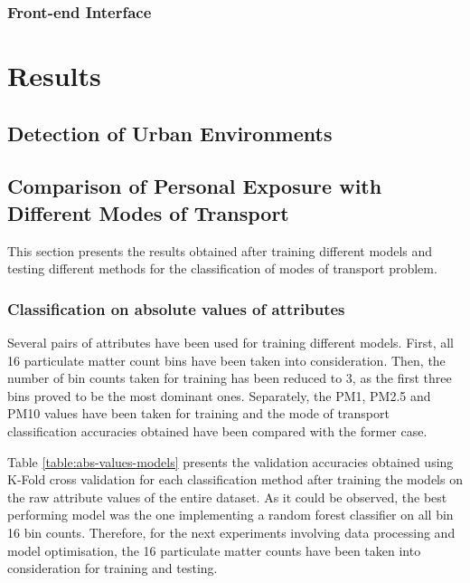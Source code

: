 \documentclass[bsc,frontabs,twoside,singlespacing,parskip,deptreport]{infthesis}     %
\begin{document}
\subsection{Front-end Interface}



\chapter{Results}



\section{Detection of Urban Environments}



\section{Comparison of Personal Exposure with Different Modes of Transport}

This section presents the results obtained after training different models and testing different methods for the classification of modes of transport problem.

\subsection{Classification on absolute values of attributes}
\label{subsec:abs-values-models}

Several pairs of attributes have been used for training different models. First, all 16 particulate matter count bins have been taken into consideration. Then, the number of bin counts taken for training has been reduced to 3, as the first three bins proved to be the most dominant ones. Separately, the PM1, PM2.5 and PM10 values have been taken for training and the mode of transport classification accuracies obtained have been compared with the former case. 

Table \ref{table:abs-values-models} presents the validation accuracies obtained using K-Fold cross validation for each classification method after training the models on the raw attribute values of the entire dataset. As it could be observed, the best performing model was the one implementing a random forest classifier on all bin 16 bin counts. Therefore, for the next experiments involving data processing and model optimisation, the 16 particulate matter counts have been taken into consideration for training and testing.
\end{document}
